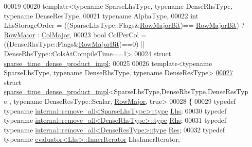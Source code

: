 \begin{DoxyCode}
00019 
00020 \textcolor{keyword}{template}<\textcolor{keyword}{typename} SparseLhsType, \textcolor{keyword}{typename} DenseRhsType, \textcolor{keyword}{typename} DenseResType,
00021          \textcolor{keyword}{typename} AlphaType,
00022          \textcolor{keywordtype}{int} LhsStorageOrder = ((SparseLhsType::Flags&\hyperlink{group__flags_gae4f56c2a60bbe4bd2e44c5b19cbe8762}{RowMajorBit})==
      \hyperlink{group__flags_gae4f56c2a60bbe4bd2e44c5b19cbe8762}{RowMajorBit}) ? \hyperlink{group__enums_ggaacded1a18ae58b0f554751f6cdf9eb13acfcde9cd8677c5f7caf6bd603666aae3}{RowMajor} : \hyperlink{group__enums_ggaacded1a18ae58b0f554751f6cdf9eb13a0cbd4bdd0abcfc0224c5fcb5e4f6669a}{ColMajor},
00023          \textcolor{keywordtype}{bool} ColPerCol = ((DenseRhsType::Flags&\hyperlink{group__flags_gae4f56c2a60bbe4bd2e44c5b19cbe8762}{RowMajorBit})==0) || 
      DenseRhsType::ColsAtCompileTime==1>
\hyperlink{struct_eigen_1_1internal_1_1sparse__time__dense__product__impl}{00024} \textcolor{keyword}{struct }\hyperlink{struct_eigen_1_1internal_1_1sparse__time__dense__product__impl}{sparse\_time\_dense\_product\_impl};
00025 
00026 \textcolor{keyword}{template}<\textcolor{keyword}{typename} SparseLhsType, \textcolor{keyword}{typename} DenseRhsType, \textcolor{keyword}{typename} DenseResType>
\hyperlink{struct_eigen_1_1internal_1_1sparse__time__dense__product__impl_3_01_sparse_lhs_type_00_01_dense_b414480199bc806c66dca70961af5e2d}{00027} \textcolor{keyword}{struct }\hyperlink{struct_eigen_1_1internal_1_1sparse__time__dense__product__impl}{sparse\_time\_dense\_product\_impl}<SparseLhsType,DenseRhsType,DenseResType
      , typename DenseResType::Scalar, \hyperlink{group__enums_ggaacded1a18ae58b0f554751f6cdf9eb13acfcde9cd8677c5f7caf6bd603666aae3}{RowMajor}, true>
00028 \{
00029   \textcolor{keyword}{typedef} \textcolor{keyword}{typename} \hyperlink{group___sparse_core___module}{internal::remove\_all<SparseLhsType>::type} 
      \hyperlink{group___sparse_core___module}{Lhs};
00030   \textcolor{keyword}{typedef} \textcolor{keyword}{typename} \hyperlink{group___sparse_core___module}{internal::remove\_all<DenseRhsType>::type} 
      \hyperlink{group___sparse_core___module}{Rhs};
00031   \textcolor{keyword}{typedef} \textcolor{keyword}{typename} \hyperlink{group___sparse_core___module}{internal::remove\_all<DenseResType>::type} 
      \hyperlink{group___sparse_core___module}{Res};
00032   \textcolor{keyword}{typedef} \textcolor{keyword}{typename} \hyperlink{struct_eigen_1_1internal_1_1evaluator}{evaluator<Lhs>::InnerIterator} LhsInnerIterator;

\end{DoxyCode}
